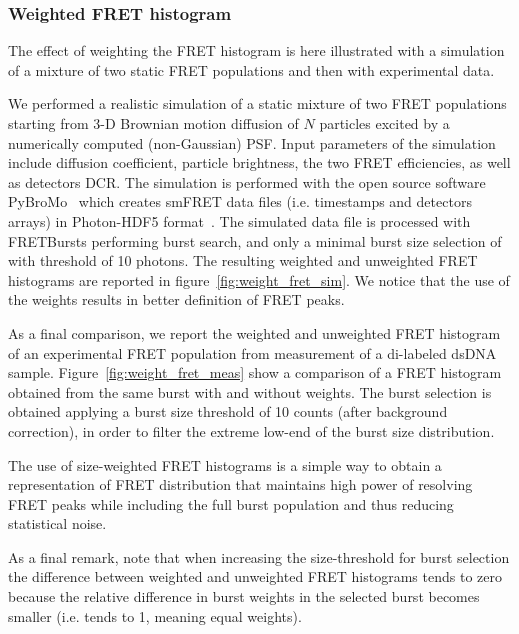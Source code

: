 \documentclass[10pt,letterpaper]{article}
\begin{document}
\subsubsection{Weighted FRET histogram}
The effect of weighting the FRET histogram is here illustrated with a simulation of
a mixture of two static FRET populations and then with experimental data.

We performed a realistic simulation of a static mixture of two FRET populations
starting from 3-D Brownian motion diffusion of $N$ particles excited by a 
numerically computed (non-Gaussian) PSF. Input parameters of the simulation include
diffusion coefficient, particle brightness, the two FRET efficiencies,
as well as detectors DCR. The simulation is performed with the open source software 
PyBroMo~\cite{Ingargiola_2016} which creates smFRET data files (i.e. timestamps 
and detectors arrays) in Photon-HDF5 format~\cite{Ingargiola2016}.
The simulated data file is processed with FRETBursts performing burst search, 
and only a minimal burst size selection of with threshold of 10 photons.
The resulting weighted and unweighted FRET histograms are reported in figure~\ref{fig:weight_fret_sim}.
We notice that the use of the weights results in better definition of FRET peaks.

As a final comparison, we report the weighted and unweighted FRET histogram of 
an experimental FRET population from measurement of a di-labeled dsDNA sample.
Figure~\ref{fig:weight_fret_meas} show a comparison of a FRET histogram obtained from the same burst
with and without weights. The burst selection is obtained applying a burst size
threshold of 10 counts (after background correction), in order to filter 
the extreme low-end of the burst size distribution.

The use of size-weighted FRET histograms is a simple way to obtain a representation of FRET 
distribution that maintains high power of resolving FRET peaks while including the full burst
population and thus reducing statistical noise.

As a final remark, note that when increasing the size-threshold for burst selection
the difference between weighted and unweighted FRET histograms tends to zero because
the relative difference in burst weights in the selected burst becomes smaller 
(i.e. tends to 1, meaning equal weights).
\end{document}
